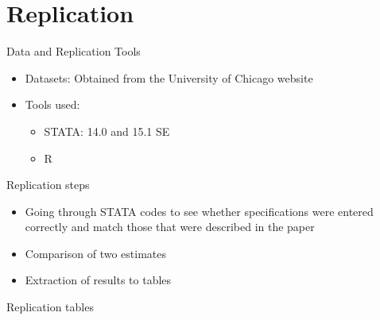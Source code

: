 \documentclass{beamer}
\begin{document}
\section{Replication}
\begin{frame}{Data and Replication Tools}
\begin{itemize}
    \item Datasets: Obtained from the University of Chicago website \item Tools used:
    \begin{itemize}
    \item STATA: 14.0 and  15.1 SE
    \item R
    \end{itemize}
    
\end{itemize}
\end{frame}
\begin{frame}{Replication steps}
 \begin{itemize}
    \item Going through STATA codes to see whether specifications were entered correctly and match those that were described in the paper
    \item Comparison of two estimates
    \item Extraction of results to tables
    \end{itemize}
\end{frame}
\begin{frame}{Replication tables}

\end{frame}

\end{document}
